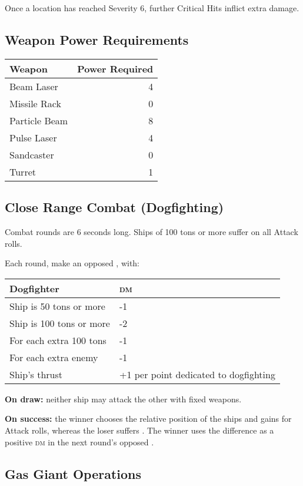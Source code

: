 \documentclass{cheatsheet}
\begin{document}
\begin{multicols}{3}
Once a location has reached Severity 6, further Critical Hits inflict
 extra damage.

\subsection{Weapon Power Requirements}

\begin{tabularx}{\linewidth}{Xr} \toprule
  Weapon & Power Required \\ \midrule
  Beam Laser & 4 \\
  Missile Rack & 0 \\
  Particle Beam & 8 \\
  Pulse Laser & 4 \\
  Sandcaster & 0 \\
  Turret & 1 \\ \bottomrule
\end{tabularx}

\subsection{Close Range Combat (Dogfighting)}

Combat rounds are 6 seconds long.  Ships of 100 tons or more suffer
 on all Attack rolls.

Each round, make an opposed , with:

\begin{tabularx}{\linewidth}{lX} \toprule
  Dogfighter & \textsc{dm} \\ \midrule
  Ship is 50 tons or more & -1 \\
  Ship is 100 tons or more & -2 \\
  For each extra 100 tons & -1 \\
  For each extra enemy & -1 \\
  Ship's thrust & +1 per point dedicated to dogfighting \\ \bottomrule
\end{tabularx}

\textbf{On draw:} neither ship may attack the other with fixed weapons.

\textbf{On success:} the winner chooses the relative position of the
ships and gains  for Attack rolls, whereas the loser
suffers .  The winner uses the difference as a positive
\textsc{dm} in the next round's opposed .

\subsection{Gas Giant Operations}


\end{multicols}
\end{document}
